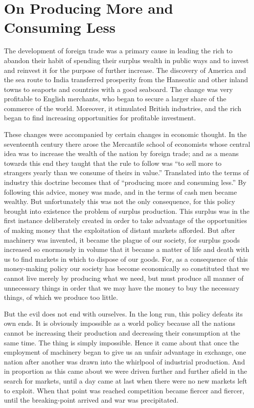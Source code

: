 \documentclass{book}
\begin{document}
\chapter{On Producing More and Consuming Less}
\label{chapter-5}
The development of foreign trade was a primary cause in leading the rich to abandon their habit of spending their surplus wealth in public ways and to invest and reinvest it for the purpose of further increase. The discovery of America and the sea route to India transferred prosperity from the Hanseatic and other inland towns to seaports and countries with a good seaboard. The change was very profitable to English merchants, who began to secure a larger share of the commerce of the world. Moreover, it stimulated British industries, and the rich began to find increasing opportunities for profitable investment.

These changes were accompanied by certain changes in economic thought. In the seventeenth century there arose the Mercantile school of economists whose central idea was to increase the wealth of the nation by foreign trade; and as a means towards this end they taught that the rule to follow was “to sell more to strangers yearly than we consume of theirs in value.” Translated into the terms of industry this doctrine becomes that of “producing more and consuming less.” By following this advice, money was made, and in the terms of cash men became wealthy. But unfortunately this was not the only consequence, for this policy brought into existence the problem of surplus production. This surplus was in the first instance deliberately created in order to take advantage of the opportunities of making money that the exploitation of distant markets afforded. But after machinery was invented, it became the plague of our society, for surplus goods increased so enormously in volume that it became a matter of life and death with us to find markets in which to dispose of our goods. For, as a consequence of this money-making policy our society has become economically so constituted that we cannot live merely by producing what we need, but must produce all manner of unnecessary things in order that we may have the money to buy the necessary things, of which we produce too little.

But the evil does not end with ourselves. In the long run, this policy defeats its own ends. It is obviously impossible as a world policy because all the nations cannot be increasing their production and decreasing their consumption at the same time. The thing is simply impossible. Hence it came about that once the employment of machinery began to give us an unfair advantage in exchange, one nation after another was drawn into the whirlpool of industrial production. And in proportion as this came about we were driven further and further afield in the search for markets, until a day came at last when there were no new markets left to exploit. When that point was reached competition became fiercer and fiercer, until the breaking-point arrived and war was precipitated.
\end{document}
